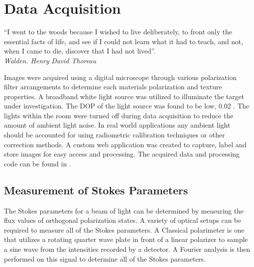 \chapter{Data Acquisition}
\begin{center}
  \begin{minipage}{0.75\textwidth}
    \begin{small}
      “I went to the woods because I wished to live deliberately, to front only the essential facts of life, and see if I could not learn what it had to teach, and not, when I came to die, discover that I had not lived”.\\
      \null\hfill\emph{Walden. Henry David Thoreau}
    \end{small}
  \end{minipage}
  \vspace{0.5cm}
\end{center}

Images were acquired using a digital microscope through various polarization filter arrangements to determine each materials polarization and texture properties.  A broadband white light source was utilized to illuminate the target under investigation.  The DOP of the light source was found to be low, 0.02 \text{\%}. The lights within the room were turned off during data acquisition to reduce the amount of ambient light noise.  In real world applications any ambient light should be accounted for using radiometric calibration techniques or other correction methods.  A custom web application was created to capture, label and store images for easy access and processing.  The acquired data and processing code can be found in \cite{noob}.

\section{Measurement of Stokes Parameters}
The Stokes parameters for a beam of light can be determined by measuring the flux values of orthogonal polarization states.  A variety of optical setups can be required to measure all of the Stokes parameters.  A Classical polarimeter is one that utilizes a rotating quarter wave plate in front of a linear polarizer to sample a sine wave from the intensities recorded by a detector.  A Fourier analysis is then performed on this signal to determine all of the Stokes parameters.


